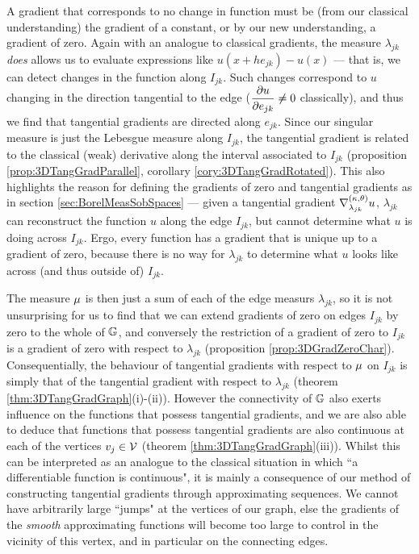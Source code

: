 A gradient that corresponds to no change in function must be (from our classical understanding) the gradient of a constant, or by our new understanding, a gradient of zero.
Again with an analogue to classical gradients, the measure $\lambda_{jk}$ \emph{does} allows us to evaluate expressions like $u(x+he_{jk})-u(x)$ --- that is, we can detect changes in the function along $I_{jk}$.
Such changes correspond to $u$ changing in the direction tangential to the edge ($\dfrac{\partial u}{\partial e_{jk}}\neq 0$ classically), and thus we find that tangential gradients are directed along $e_{jk}$.
Since our singular measure is just the Lebesgue measure along $I_{jk}$, the tangential gradient is related to the classical (weak) derivative along the interval associated to $I_{jk}$ (proposition \ref{prop:3DTangGradParallel}, corollary \ref{cory:3DTangGradRotated}).
This also highlights the reason for defining the gradients of zero and tangential gradients as in section \ref{sec:BorelMeasSobSpaces} --- given a tangential gradient $\nabla^{\left( \kappa, \theta \right)}_{\lambda_{jk}}u$, $\lambda_{jk}$ can reconstruct the function $u$ along the edge $I_{jk}$, but cannot determine what $u$ is doing across $I_{jk}$.
Ergo, every function has a gradient that is unique up to a gradient of zero, because there is no way for $\lambda_{jk}$ to determine what $u$ looks like across (and thus outside of) $I_{jk}$.

The measure $\mu$ is then just a sum of each of the edge measurs $\lambda_{jk}$, so it is not unsurprising for us to find that we can extend gradients of zero on edges $I_{jk}$ by zero to the whole of $\mathbb{G}$, and conversely the restriction of a gradient of zero to $I_{jk}$ is a gradient of zero with respect to $\lambda_{jk}$ (proposition \ref{prop:3DGradZeroChar}).
Consequentially, the behaviour of tangential gradients with respect to $\mu$ on $I_{jk}$ is simply that of the tangential gradient with respect to $\lambda_{jk}$ (theorem \ref{thm:3DTangGradGraph}(i)-(ii)).
However the connectivity of $\mathbb{G}$ also exerts influence on the functions that possess tangential gradients, and we are also able to deduce that functions that possess tangential gradients are also continuous at each of the vertices $v_j\in\mathcal{V}$ (theorem \ref{thm:3DTangGradGraph}(iii)).
Whilst this can be interpreted as an analogue to the classical situation in which ``a differentiable function is continuous", it is mainly a consequence of our method of constructing tangential gradients through approximating sequences.
We cannot have arbitrarily large ``jumps" at the vertices of our graph, else the gradients of the \emph{smooth} approximating functions will become too large to control in the vicinity of this vertex, and in particular on the connecting edges.

